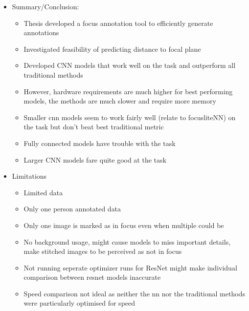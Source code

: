 \begin{itemize}
    \item Summary/Conclusion:
    \begin{itemize}
        \item Thesis developed a focus annotation tool to efficiently generate annotations
        \item Investigated feasibility of predicting distance to focal plane

        \item Developed CNN models that work well on the task and outperform all traditional methods
        \item However, hardware requirements are much higher for best performing models, the methods are much slower and require more memory
        \item Smaller cnn models seem to work fairly well (relate to focusliteNN) on the task but don't beat best traditional metric
        \item Fully connected models have trouble with the task
        \item Larger CNN models fare quite good at the task
    \end{itemize}

    \item Limitations
    \begin{itemize}
        \item Limited data
        \item Only one person annotated data
        \item Only one image is marked as in focus even when multiple could be
        \item No background usage, might cause models to miss important details, make stitched images to be perceived as not in focus
        \item Not running seperate optimizer runs for ResNet might make individual comparison between resnet models inaccurate
        \item Speed comparison not ideal as neither the nn nor the traditional methods were particularly optimised for speed
    \end{itemize}


\end{itemize}
